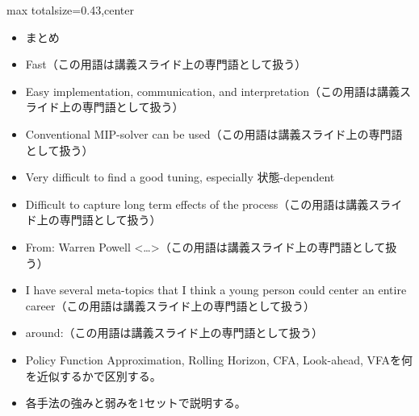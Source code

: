 \clearpage
{}
\begin{minipage}[t]{0.405\textwidth}
\begin{adjustbox}{max totalsize={\textwidth}{0.43\textheight},center}
\begin{minipage}{\textwidth}\scriptsize
{}\begin{itemize}
\item まとめ
\item Fast（この用語は講義スライド上の専門語として扱う）
\item Easy implementation, communication, and interpretation（この用語は講義スライド上の専門語として扱う）
\item Conventional MIP-solver can be used（この用語は講義スライド上の専門語として扱う）
\item Very difficult to find a good tuning, especially 状態-dependent
\item Difficult to capture long term effects of the process（この用語は講義スライド上の専門語として扱う）
\item From: Warren Powell <…>（この用語は講義スライド上の専門語として扱う）
\item I have several meta-topics that I think a young person could center an entire career（この用語は講義スライド上の専門語として扱う）
\item around:（この用語は講義スライド上の専門語として扱う）
\end{itemize}\begin{itemize}
\item Policy Function Approximation, Rolling Horizon, CFA, Look-ahead, VFAを何を近似するかで区別する。
\item 各手法の強みと弱みを1セットで説明する。
\end{itemize}
\end{minipage}
\end{adjustbox}
\end{minipage}\hfill
